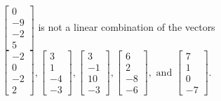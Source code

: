 \begin{exercise}
\begin{exerciseStatement}
  \end{exerciseStatement}
  \begin{exerciseAnswer}
   \(\left[\begin{array}{c}
0 \\
-9 \\
-2 \\
5
\end{array}\right]\) 
  	 is not  
	a linear combination of the vectors \(\left[\begin{array}{c}
-2 \\
0 \\
-2 \\
2
\end{array}\right] , \left[\begin{array}{c}
3 \\
1 \\
-4 \\
-3
\end{array}\right] , \left[\begin{array}{c}
3 \\
-1 \\
10 \\
-3
\end{array}\right] , \left[\begin{array}{c}
6 \\
2 \\
-8 \\
-6
\end{array}\right] , \text{ and } \left[\begin{array}{c}
7 \\
1 \\
0 \\
-7
\end{array}\right]\).

	
  


  \end{exerciseAnswer}
\end{exercise}